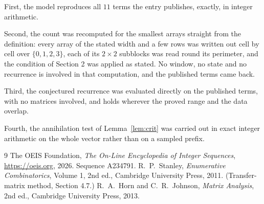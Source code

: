 \documentclass[11pt,a4paper]{article}
\theoremstyle{plain}
\theoremstyle{definition}
\begin{document}
First, the model reproduces all $11$ terms the entry publishes, exactly, in integer
arithmetic.

Second, the count was recomputed for the smallest arrays straight from the definition: every
array of the stated width and a few rows was written out cell by cell over $\{0,1,2,3\}$, each of
its $2\times2$ subblocks was read round its perimeter, and the condition of Section 2 was
applied as stated. No window, no state and no recurrence is involved in that computation, and
the published terms came back.

Third, the conjectured recurrence was evaluated directly on the published terms, with no
matrices involved, and holds wherever the proved range and the data overlap.

Fourth, the annihilation test of Lemma~\ref{lem:crit} was carried out in exact integer
arithmetic on the whole vector rather than on a sampled prefix.

\begin{thebibliography}{9}
 The OEIS Foundation, \emph{The On-Line Encyclopedia of Integer
Sequences}, \url{https://oeis.org}, 2026. Sequence A234791.
 R.~P.~Stanley, \emph{Enumerative Combinatorics}, Volume 1, 2nd ed.,
Cambridge University Press, 2011. (Transfer-matrix method, Section 4.7.)
 R.~A.~Horn and C.~R.~Johnson, \emph{Matrix Analysis}, 2nd ed., Cambridge
University Press, 2013.
\end{thebibliography}
\end{document}
